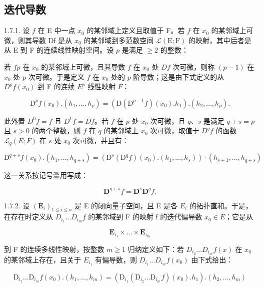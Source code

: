 \subsection{迭代导数}

1.7.1. 设 \(f\) 在 E 中一点 \(x_{0}\) 的某邻域上定义且取值于 F。若 \(f\) 在 \(x_{0}\) 的某邻域上可微，则其导数 Df 是从 \(x_{0}\) 的某邻域到多范数空间 \(\mathcal{L}(\mathrm{E};\mathrm{F})\) 的映射，其中后者是从 E 到 F 的连续线性映射空间。设 \(p\) 是满足 \(\geqslant 2\) 的整数：

若 \(f\)\(p\) 在 \(x_0\) 的某邻域上可微，且其导数 \(f\) 在 \(x_0\) 处 \(Df\) 次可微，则称 \((p - 1)\) 在 \(x_0\) 处 \(p\) 次可微。于是定义 \(f\) 在 \(x_0\) 处的 \(p\) 阶导数；这是由下式定义的从 \(D^p f(x_0)\) 到 F 的连续 \(E^p\) 线性映射 \(F\)：

\[
\mathrm{D} ^ {p} f (x _ {0}). (h _ {1}, \dots , h _ {p}) = (\mathrm{D} (\mathrm{D} ^ {p - 1} f) (x _ {0}). h _ {1}). (h _ {2}, \dots , h _ {p}).
\]

此外置 \(D^{0}f = f\) 且 \(D^{1}f = Df\)。若 \(f\) 在 \(p\) 处 \(x_{0}\) 次可微，且 \(q\)、\(s\) 是满足 \(q + s = p\) 且 \(s > 0\) 的两个整数，则 \(f\) 在 \(q\) 的某邻域上 \(x_{0}\) 次可微，取值于 \(D^{q}f\) 的函数 \(\mathcal{L}_{q}(E; F)\) 在 \(s\) 处 \(x_{0}\) 次可微，并且有：

\[
\mathrm{D} ^ {q + s} f (x _ {0}). (h _ {1}, \dots , h _ {q + s}) = (\mathrm{D} ^ {s} (\mathrm{D} ^ {q} f) (x _ {0}). (h _ {1}, \dots , h _ {s})) \cdot (h _ {s + 1}, \dots , h _ {q + s})
\]

这一关系按记号滥用写成：

\[
\mathbf {D} ^ {q + s} f = \mathbf {D} ^ {s} \mathbf {D} ^ {q} f.
\]

1.7.2. 设 \((\mathbf{E}_{i})_{1\leqslant i\leqslant n}\) 是 E 的闭向量子空间，且 E 是各 \(E_{i}\) 的拓扑直和。于是，在存在时定义从 \(D_{i_{1}}\ldots D_{i_{m}}f\) 的某邻域到 F 的映射 f 的迭代偏导数 \(x_{0}\in E\)；它是从

\[
\mathbf {E} _ {i _ {1}} \times \dots \times \mathbf {E} _ {i _ {m}}
\]

到 F 的连续多线性映射，按整数 \(m \geqslant 1\) 归纳定义如下：若 \(D_{i_{2}} \ldots D_{i_{m}} f(x)\) 在 \(x_{0}\) 的某邻域上存在，且关于 \(E_{i_{1}}\) 有偏导数，则 \(D_{i_{1}} \ldots D_{i_{m}} f(x_{0})\) 由下式给出：

\[
\mathrm{D} _ {i _ {1}} \dots \mathrm{D} _ {i _ {m}} f (x _ {0}). (h _ {1}, \dots , h _ {m}) = (\mathrm{D} _ {i _ {1}} (\mathrm{D} _ {i _ {2}} \dots \mathrm{D} _ {i _ {m}} f) (x _ {0}). h _ {1}). (h _ {2}, \dots , h _ {m})
\]

